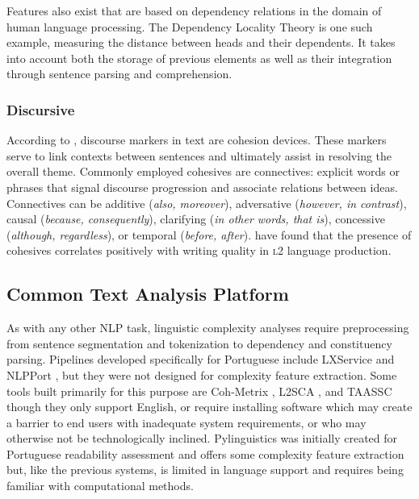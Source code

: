 Features also exist that are based on dependency relations in the domain of human language processing. The Dependency Locality Theory \citep{gibson2000} is one such example, measuring the distance between heads and their dependents. It takes into account both the storage of previous elements as well as their integration through sentence parsing and comprehension.

\subsubsection{Discursive}
\label{section:coh}

According to \cite{granger, graesser2004-cohmetrix}, discourse markers in text are cohesion devices. These markers serve to link contexts between sentences and ultimately assist in resolving the overall theme. Commonly employed cohesives are connectives: explicit words or phrases that signal discourse progression and associate relations between ideas. Connectives can be additive (\textit{also, moreover}), adversative (\textit{however, in contrast}), causal (\textit{because, consequently}), clarifying (\textit{in other words, that is}), concessive (\textit{although, regardless}), or temporal (\textit{before, after}).  have found that the presence of cohesives correlates positively with writing quality in {\scshape l2} language production.


\subsection{Common Text Analysis Platform}

As with any other NLP task, linguistic complexity analyses require preprocessing from sentence segmentation and tokenization to dependency and constituency parsing. Pipelines developed specifically for Portuguese include LXService \citep{branco-2008-lx} and NLPPort \citep{rodrigues2018-nlpport}, but they were not designed for complexity feature extraction. Some tools built primarily for this purpose are Coh-Metrix \citep{graesser2004-cohmetrix}, L2SCA \citep{lu2010-l2}, and TAASSC \citep{kyle2016-taassc} though they only support English, or require installing software which may create a barrier to end users with inadequate system requirements, or who may otherwise not be technologically inclined. Pylinguistics \citep{pylinguistics} was initially created for Portuguese readability assessment and offers some complexity feature extraction but, like the previous systems, is limited in language support and requires being familiar with computational methods.

